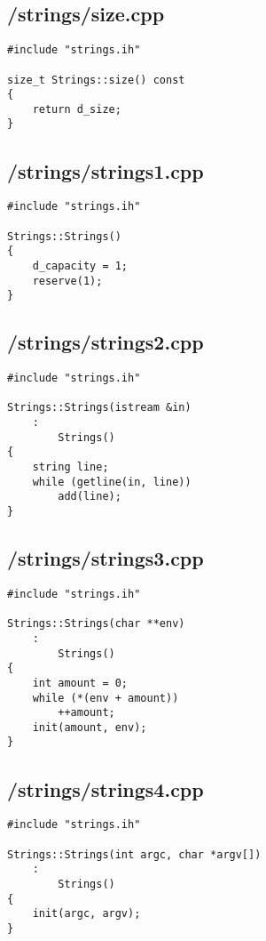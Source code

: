 \documentclass{article}
\begin{document}
\subsection*{/strings/size.cpp}
\begin{verbatim}
#include "strings.ih"

size_t Strings::size() const
{
    return d_size;   
}
\end{verbatim}
\subsection*{/strings/strings1.cpp}
\begin{verbatim}
#include "strings.ih"

Strings::Strings()
{
    d_capacity = 1;
    reserve(1);
}

\end{verbatim}
\subsection*{/strings/strings2.cpp}
\begin{verbatim}
#include "strings.ih"

Strings::Strings(istream &in)
    :
        Strings()
{
    string line;
    while (getline(in, line))
        add(line);
}

\end{verbatim}
\subsection*{/strings/strings3.cpp}
\begin{verbatim}
#include "strings.ih"

Strings::Strings(char **env)
    :
        Strings()
{
    int amount = 0;
    while (*(env + amount))
        ++amount;
    init(amount, env);
}
\end{verbatim}
\subsection*{/strings/strings4.cpp}
\begin{verbatim}
#include "strings.ih"

Strings::Strings(int argc, char *argv[])
    :
        Strings()
{
    init(argc, argv);
}
\end{verbatim}
\end{document}

